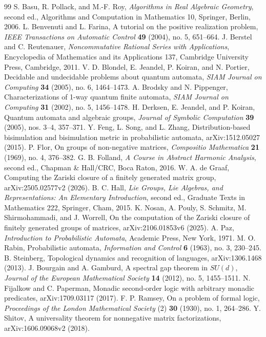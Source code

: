 \begin{thebibliography}{99}
 S. Basu, R. Pollack, and M.-F. Roy, \emph{Algorithms in Real Algebraic Geometry}, second ed., Algorithms and Computation in Mathematics 10, Springer, Berlin, 2006.
 L. Benvenuti and L. Farina, A tutorial on the positive realization problem, \emph{IEEE Transactions on Automatic Control} \textbf{49} (2004), no. 5, 651--664.
 J. Berstel and C. Reutenauer, \emph{Noncommutative Rational Series with Applications}, Encyclopedia of Mathematics and its Applications 137, Cambridge University Press, Cambridge, 2011.
 V. D. Blondel, E. Jeandel, P. Koiran, and N. Portier, Decidable and undecidable problems about quantum automata, \emph{SIAM Journal on Computing} \textbf{34} (2005), no. 6, 1464--1473.
 A. Brodsky and N. Pippenger, Characterizations of 1-way quantum finite automata, \emph{SIAM Journal on Computing} \textbf{31} (2002), no. 5, 1456--1478.
 H. Derksen, E. Jeandel, and P. Koiran, Quantum automata and algebraic groups, \emph{Journal of Symbolic Computation} \textbf{39} (2005), nos. 3--4, 357--371.
 Y. Feng, L. Song, and L. Zhang, Distribution-based bisimulation and bisimulation metric in probabilistic automata, arXiv:1512.05027 (2015).
 P. Flor, On groups of non-negative matrices, \emph{Compositio Mathematica} \textbf{21} (1969), no. 4, 376--382.
 G. B. Folland, \emph{A Course in Abstract Harmonic Analysis}, second ed., Chapman \& Hall/CRC, Boca Raton, 2016.
 W. A. de Graaf, Computing the Zariski closure of a finitely generated matrix group, arXiv:2505.02577v2 (2026).
 B. C. Hall, \emph{Lie Groups, Lie Algebras, and Representations: An Elementary Introduction}, second ed., Graduate Texts in Mathematics 222, Springer, Cham, 2015.
 K. Nosan, A. Pouly, S. Schmitz, M. Shirmohammadi, and J. Worrell, On the computation of the Zariski closure of finitely generated groups of matrices, arXiv:2106.01853v6 (2025).
 A. Paz, \emph{Introduction to Probabilistic Automata}, Academic Press, New York, 1971.
 M. O. Rabin, Probabilistic automata, \emph{Information and Control} \textbf{6} (1963), no. 3, 230--245.
 B. Steinberg, Topological dynamics and recognition of languages, arXiv:1306.1468 (2013).
 J. Bourgain and A. Gamburd, A spectral gap theorem in $SU(d)$, \emph{Journal of the European Mathematical Society} \textbf{14} (2012), no. 5, 1455--1511.
 N. Fijalkow and C. Paperman, Monadic second-order logic with arbitrary monadic predicates, arXiv:1709.03117 (2017).
 F. P. Ramsey, On a problem of formal logic, \emph{Proceedings of the London Mathematical Society} (2) \textbf{30} (1930), no. 1, 264--286.
 Y. Shitov, A universality theorem for nonnegative matrix factorizations, arXiv:1606.09068v2 (2018).
\end{thebibliography}
